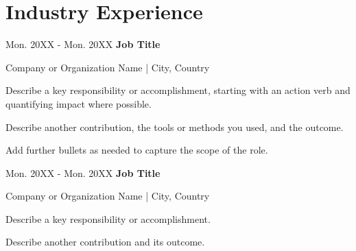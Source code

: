 \section{Industry Experience}
    \begin{twocolentry}{Mon. 20XX - Mon. 20XX} \textbf{Job Title}\\
    \end{twocolentry}
    \begin{onecolentry}
        Company or Organization Name | City, Country
    \end{onecolentry}
    \vspace{0.10cm}
    \begin{onecolentry}
        \begin{highlights}
            \item Describe a key responsibility or accomplishment, starting with an action verb and quantifying impact where possible.
            \item Describe another contribution, the tools or methods you used, and the outcome.
            \item Add further bullets as needed to capture the scope of the role.
        \end{highlights}
    \end{onecolentry}

    \vspace{0.2cm}

    \begin{twocolentry}{Mon. 20XX - Mon. 20XX}
        \textbf{Job Title}\\
    \end{twocolentry}
    \begin{onecolentry}
        Company or Organization Name | City, Country
    \end{onecolentry}
    \vspace{0.10cm}
    \begin{onecolentry}
        \begin{highlights}
            \item Describe a key responsibility or accomplishment.
            \item Describe another contribution and its outcome.
        \end{highlights}
    \end{onecolentry}
